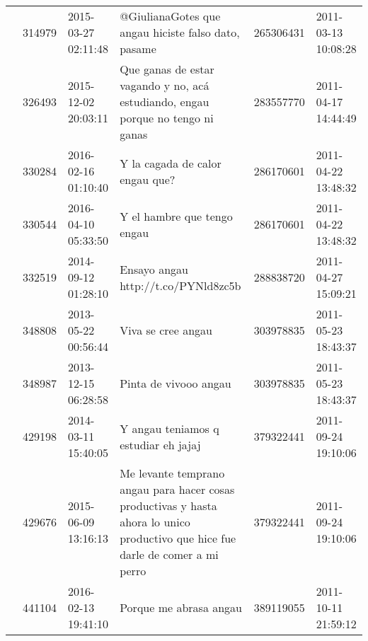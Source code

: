 \begin{tabular}{llllrl}
           & 314979  & 2015-03-27 02:11:48 &                                                                                          @GiulianaGotes que angau hiciste falso dato, pasame &   265306431 & 2011-03-13 10:08:28 \\
           & 326493  & 2015-12-02 20:03:11 &                                                              Que ganas de estar vagando y no, acá estudiando, engau porque no tengo ni ganas &   283557770 & 2011-04-17 14:44:49 \\
           & 330284  & 2016-02-16 01:10:40 &                                                                                                              Y la cagada de calor engau que? &   286170601 & 2011-04-22 13:48:32 \\
           & 330544  & 2016-04-10 05:33:50 &                                                                                                                  Y el hambre que tengo engau &   286170601 & 2011-04-22 13:48:32 \\
           & 332519  & 2014-09-12 01:28:10 &                                                                                                       Ensayo angau 👃👃 http://t.co/PYNld8zc5b &   288838720 & 2011-04-27 15:09:21 \\
           & 348808  & 2013-05-22 00:56:44 &                                                                                                                           Viva se cree angau &   303978835 & 2011-05-23 18:43:37 \\
           & 348987  & 2013-12-15 06:28:58 &                                                                                                                        Pinta de vivooo angau &   303978835 & 2011-05-23 18:43:37 \\
           & 429198  & 2014-03-11 15:40:05 &                                                                                                         Y angau teniamos q estudiar eh jajaj &   379322441 & 2011-09-24 19:10:06 \\
           & 429676  & 2015-06-09 13:16:13 &              Me levante temprano angau para hacer cosas productivas y hasta ahora lo unico productivo que hice fue darle de comer a mi perro &   379322441 & 2011-09-24 19:10:06 \\
           & 441104  & 2016-02-13 19:41:10 &                                                                                                                       Porque me abrasa angau &   389119055 & 2011-10-11 21:59:12 \\

\end{tabular}
